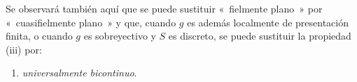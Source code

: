 Se observará también aquí que se puede sustituir «~fielmente plano~» por
«~cuasifielmente plano~» y que, cuando $g$ es además localmente de presentación
finita, o cuando $g$ es sobreyectivo y $S$ es discreto, se puede sustituir la
propiedad (iii) por:
\begin{enumerate}
\item[(iii \emph{bis})] \emph{universalmente bicontinuo}.
\end{enumerate}


